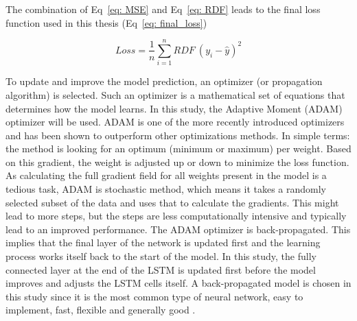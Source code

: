 \documentclass[twocolumn, 10pt, a4paper]{memoir}
\begin{document}
	The combination of Eq~\ref{eq: MSE} and Eq~\ref{eq: RDF} leads to the final loss function used in this thesis (Eq~\ref{eq: final_loss})
	
	\begin{equation}
		\label{eq: final_loss}
		Loss = \frac{1}{n} \sum_{i=1}^{n} RDF \ (y_i - \hat{y})^2
	\end{equation}
	
	To update and improve the model prediction, an optimizer (or propagation algorithm) is selected. Such an optimizer is a mathematical set of equations that determines how the model learns. In this study, the Adaptive Moment (ADAM) optimizer will be used. ADAM is one of the more recently introduced optimizers and has been shown to outperform other optimizations methods. \cite{Kingma2014} In simple terms: the method is looking for an optimum (minimum or maximum) per weight. Based on this gradient, the weight is adjusted up or down to minimize the loss function. As calculating the full gradient field for all weights present in the model is a tedious task, ADAM is stochastic method, which means it takes a randomly selected subset of the data and uses that to calculate the gradients. This might lead to more steps, but the steps are less computationally intensive and typically lead to an improved performance.  
	The ADAM optimizer is back-propagated. This implies that the final layer of the network is updated first and the learning process works itself back to the start of the model. In this study, the fully connected layer at the end of the LSTM is updated first before the model improves and adjusts the LSTM cells itself. A back-propagated model is chosen in this study since it is the most common type of neural network, easy to implement, fast, flexible and generally good \cite{Staudemeyer2019}.
	
\end{document}
